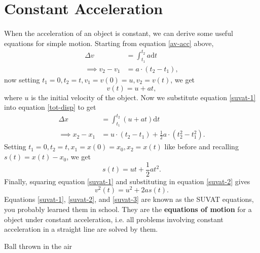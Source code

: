 \documentclass[../newtonian_mechanics.tex]{subfiles}
\begin{document}
    \section{Constant Acceleration}
        \paragraph{}
        When the acceleration of an object is constant, we can derive some useful equations for simple motion. Starting from equation \ref{av-acc} above,
        \begin{align*}
            \Delta v&=\int_{t_1}^{t_2}a\mathrm{d}t\\
            \implies v_2-v_1&=a\cdot(t_2-t_1),
        \end{align*}
        now setting $t_1=0,t_2=t,v_1=v(0)=u,v_2=v(t)$, we get
        \begin{equation}\label{suvat-1}
            v(t)=u+at,
        \end{equation}
        where $u$ is the initial velocity of the object.
        Now we substitute equation \ref{suvat-1} into equation \ref{tot-disp} to get
        \begin{align*}
            \Delta x&=\int_{t_1}^{t_2}(u+at)\mathrm{d}t\\
            \implies x_2-x_1&=u\cdot(t_2-t_1)+\frac{1}{2}a\cdot(t_2^2-t_1^2).
        \end{align*}
        Setting $t_1=0,t_2=t,x_1=x(0)=x_0,x_2=x(t)$ like before and recalling $s(t)=x(t)-x_0$, we get
        \begin{equation}\label{suvat-2}
            s(t)=ut+\frac{1}{2}at^2.
        \end{equation}
        Finally, squaring equation \ref{suvat-1} and substituting in equation \ref{suvat-2} gives
        \begin{equation}\label{suvat-3}
            v^2(t)=u^2+2as(t).
        \end{equation}
        Equations \ref{suvat-1}, \ref{suvat-2}, and \ref{suvat-3} are known as the SUVAT equations, you probably learned them in school. They are the \textbf{equations of motion} for a object under constant acceleration, i.e. all problems involving constant acceleration in a straight line are solved by them.
        \begin{example}
            Ball thrown in the air %
        \end{example}
\end{document}
